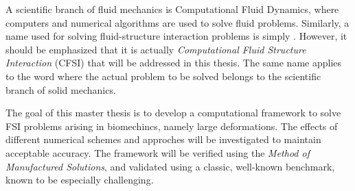 A scientific branch of fluid mechanics is Computational Fluid Dynamics, where computers and numerical algorithms are used to solve fluid problems. Similarly, a name used for solving fluid-structure interaction problems is simply . However, it should be emphasized that it is actually \textit{Computational Fluid Structure Interaction} (CFSI) that will be addressed in this thesis. The same name applies to the word  where the actual problem to be solved belongs to the scientific branch of solid mechanics. \newline

The goal of this master thesis is to develop a computational framework to solve FSI problems arising in biomechincs, namely large deformations. The effects of different numerical schemes and approches will be investigated to maintain acceptable accuracy. The framework will be verified using the \textit{Method of Manufactured Solutions}, and validated using a classic, well-known benchmark, known to be especially challenging. 

